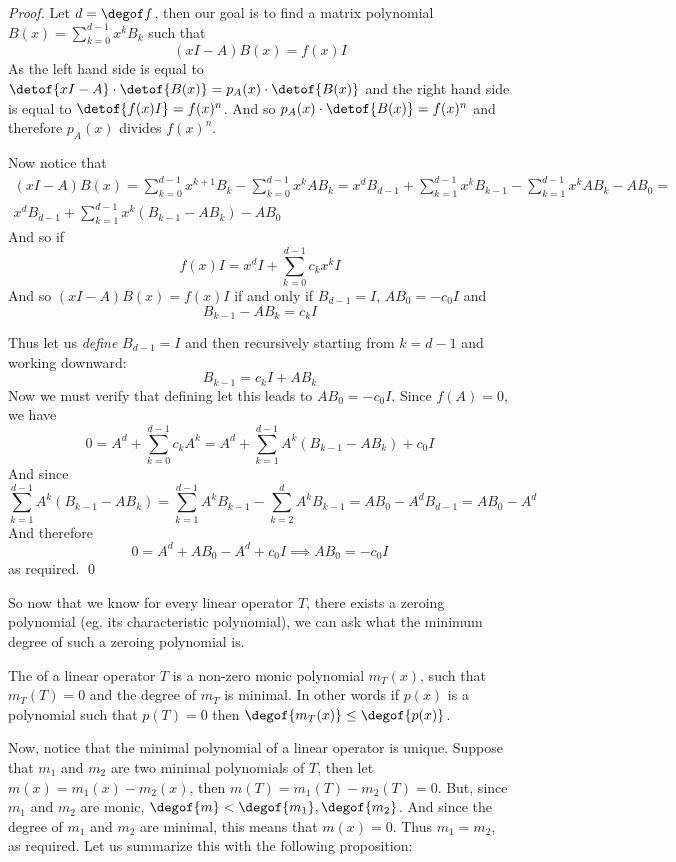 \begin{proof}

    Let $d=\degof f$, then our goal is to find a matrix polynomial $B(x)=\sum_{k=0}^{d-1}x^kB_k$ such that
    \[ (xI-A)B(x) = f(x)I \]
    As the left hand side is equal to $\detof{xI-A}\cdot\detof{B(x)}=p_A(x)\cdot\detof{B(x)}$ and the right hand side is equal to $\detof{f(x)I}=f(x)^n$.
    And so $p_A(x)\cdot\detof{B(x)}=f(x)^n$ and therefore $p_A(x)$ divides $f(x)^n$.

    Now notice that
    \begin{multline*}
        (xI-A)B(x) = \sum_{k=0}^{d-1}x^{k+1}B_k - \sum_{k=0}^{d-1}x^kAB_k = x^dB_{d-1} + \sum_{k=1}^{d-1} x^kB_{k-1} - \sum_{k=1}^{d-1}x^kAB_k - AB_0 =\\
        x^dB_{d-1} + \sum_{k=1}^{d-1}x^k(B_{k-1}-AB_k) - AB_0 
    \end{multline*}
    And so if
    \[ f(x)I = x^dI + \sum_{k=0}^{d-1}c_kx^kI \]
    And so $(xI-A)B(x)=f(x)I$ if and only if $B_{d-1}=I$, $AB_0=-c_0I$ and
    \[ B_{k-1} - AB_k = c_kI \]

    Thus let us \emph{define} $B_{d-1}=I$ and then recursively starting from $k=d-1$ and working downward:
    \[ B_{k-1} = c_kI + AB_k \]
    Now we must verify that defining let this leads to $AB_0=-c_0I$.
    Since $f(A)=0$, we have
    \[ 0 = A^d + \sum_{k=0}^{d-1} c_kA^k = A^d + \sum_{k=1}^{d-1}A^k(B_{k-1}-AB_k) + c_0I \]
    And since
    \[ \sum_{k=1}^{d-1}A^k(B_{k-1}-AB_k) = \sum_{k=1}^{d-1}A^kB_{k-1} - \sum_{k=2}^{d}A^kB_{k-1} = AB_0 - A^dB_{d-1} = AB_0 - A^d \]
    And therefore
    \[ 0 = A^d + AB_0 - A^d + c_0I \implies AB_0 = -c_0I \]
    as required.
    \qed

\end{proof}

So now that we know for every linear operator $T$, there exists a zeroing polynomial (eg. its characteristic polynomial), we can ask what the minimum degree of such a zeroing polynomial is.

\begin{defn*}

    The  of a linear operator $T$ is a non-zero monic polynomial $m_T(x)$, such that $m_T(T)=0$ and the degree of $m_T$ is minimal.
    In other words if $p(x)$ is a polynomial such that $p(T)=0$ then $\degof{m_T(x)}\leq\degof{p(x)}$.

\end{defn*}

Now, notice that the minimal polynomial of a linear operator is unique.
Suppose that $m_1$ and $m_2$ are two minimal polynomials of $T$, then let $m(x)=m_1(x)-m_2(x)$, then $m(T)=m_1(T)-m_2(T)=0$.
But, since $m_1$ and $m_2$ are monic, $\degof{m}<\degof{m_1},\degof{m_2}$.
And since the degree of $m_1$ and $m_2$ are minimal, this means that $m(x)=0$.
Thus $m_1=m_2$, as required.
Let us summarize this with the following proposition:

